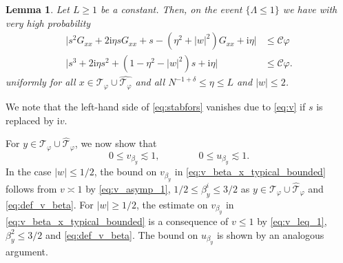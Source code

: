 \documentclass[11pt]{article}
\newcommand{\ii}{\mathrm{i}}
\newcommand{\abs}[1]{\left| #1 \right|}
\newcommand{\absb}[1]{\bigl| #1 \bigr|}
\theoremstyle{plain}
\newtheorem{lemma}{Lemma}[section]
\theoremstyle{remark}
\numberwithin{equation}{section}
\newcommand*\ubarr[1]{{\widehat{#1}}}
\begin{document}
	\begin{lemma}\label{lem:meanoftypicalvertices}
		Let $L \geq 1$ be a constant. Then, on the event $\{\Lambda \leq 1\}$ we have with very high probability 
		\begin{align} \label{eq:s_G_xx_relation} 
			\absb{s^2 G_{xx} + 2\ii \eta s G_{xx} + s -(\eta^2 + \abs{w}^2) G_{xx} + \ii \eta} &\le  \mathcal{C} \varphi\\ 
			\label{eq:stabfors}
			\absb{s^3  + 2 \ii \eta s^2 +(1 - \eta^2 - \abs{w}^2)s+ \ii \eta} & \leq \mathcal C   \varphi .
		\end{align}
		uniformly for all $x \in \mathcal T_{\varphi}\cup \ubarr{\mathcal T_{\varphi}}$ and all $N^{-1+ \delta} \le \eta \le L$ and $ \abs{w} \le 2$.
	\end{lemma}
	
	We note that the left-hand side of \eqref{eq:stabfors} vanishes due to \eqref{eq:v}
	if $s$ is replaced by $\ii v$. 
	
	For $y \in \mathcal T_{\varphi} \cup \ubarr{\mathcal T}_{\varphi}$, we now show that  
	\begin{equation}
	0 \leq v_{\beta_y} \lesssim 1, \qquad \qquad 0 \leq u_{\beta_y} \lesssim 1  \label{eq:v_beta_x_typical_bounded}. 
	 \end{equation} 
	 In the case $\abs{w} \leq 1/2$, the bound on $v_{\beta_y}$ in \cref{eq:v_beta_x_typical_bounded} follows from $v \asymp 1$ by \cref{eq:v_asymp_1}, $1/2 \leq \beta_y^i \leq 3/2$ as $y \in \mathcal{T}_{\varphi} \cup \ubarr{\mathcal{T}}_{\varphi}$ and \cref{eq:def_v_beta}. 
	For $\abs{w} \geq 1/2$,  the estimate on $v_{\beta_y}$ in \cref{eq:v_beta_x_typical_bounded} is a consequence of $v \leq 1$ by \cref{eq:v_leq_1}, $\beta_y^2 \leq 3/2$ and \cref{eq:def_v_beta}. 
	The bound on $u_{\beta_y}$ is shown by an analogous argument.  
	
\end{document}
